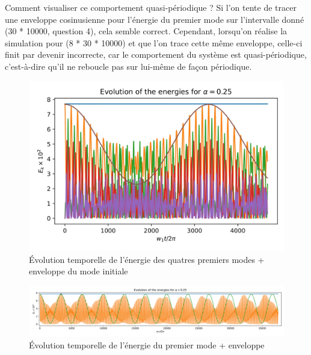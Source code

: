 \documentclass[a4paper, 11pt]{article}
\begin{document}
Comment visualiser ce comportement quasi-périodique ? Si l'on tente de tracer une enveloppe cosinusienne pour l'énergie du premier mode sur l'intervalle donné (30 * 10000, question 4), cela semble correct. Cependant, lorsqu'on réalise la simulation pour (8 * 30 * 10000) et que l'on trace cette même enveloppe, celle-ci finit par devenir incorrecte, car le comportement du système est quasi-périodique, c'est-à-dire qu'il ne reboucle pas sur lui-même de façon périodique.

\begin{figure}[H]
    \centering
    \includegraphics[width=0.6\linewidth]{pics/fput_long_courbe.jpg}
    \caption{Évolution temporelle de l'énergie des quatres premiers modes + enveloppe du mode initiale}
    \label{fig:Q4}
\end{figure}

\begin{figure}[H]
    \centering
    \includegraphics[width=0.75\linewidth]{pics/fput_long_tres_longue.jpg}
    \caption{Évolution temporelle de l'énergie du premier mode + enveloppe}
    \label{fig:Q4}
\end{figure}
\end{document}
